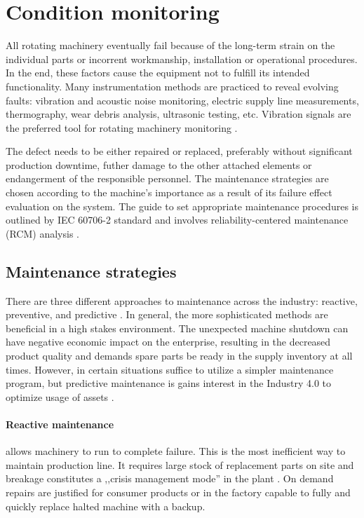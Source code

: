 \section{Condition monitoring}
All rotating machinery eventually fail because of the long-term strain on the individual parts or incorrent workmanship, installation or operational procedures. In the end, these factors cause the equipment not to fulfill its intended functionality. Many instrumentation methods are practiced to reveal evolving faults: vibration and acoustic noise monitoring, electric supply line measurements, thermography, wear debris analysis, ultrasonic testing, etc. Vibration signals are the preferred tool for rotating machinery monitoring \cite{mohanty_machinery_2015}. 

The defect needs to be either repaired or replaced, preferably without significant production downtime, futher damage to the other attached elements or endangerment of the responsible personnel. The maintenance strategies are chosen according to the machine's importance as a result of its failure effect evaluation on the system. The guide to set appropriate maintenance procedures is outlined by IEC 60706-2 standard and involves reliability-centered maintenance (RCM) analysis \cite{el-thalji_predictive_2019}.

\subsection{Maintenance strategies}
There are three different approaches to maintenance across the industry: reactive, preventive, and predictive \cite{scheffer_practical_2004}. In general, the more sophisticated methods are beneficial in a high stakes environment. The unexpected machine shutdown can have negative economic impact on the enterprise, resulting in the decreased product quality and demands spare parts be ready in the supply inventory at all times. However, in certain situations suffice to utilize a simpler maintenance program, but predictive maintenance is gains interest in the Industry 4.0 to optimize usage of assets \cite{cinar_machine_2020}.

\paragraph{Reactive maintenance} allows machinery to run to complete failure. This is the most inefficient way to maintain production line. It requires large stock of replacement parts on site and breakage constitutes a ,,crisis management mode'' in the plant \cite{scheffer_practical_2004}. On demand repairs are justified for consumer products or in the factory capable to fully and quickly replace halted machine with a backup. 

